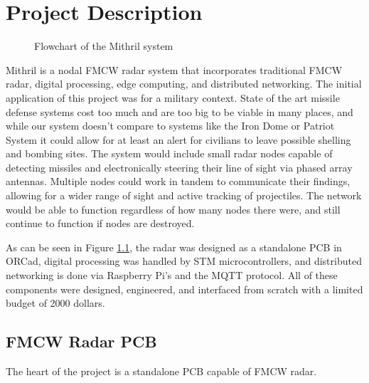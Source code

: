 \chapter{Project Description 
\label{Project Description}}
\begin{figure}[H]
  \centering
  \caption{Flowchart of the Mithril system}
  \label{fig:mithril_flowchart}
  \end{figure}
Mithril is a nodal FMCW radar system that incorporates traditional FMCW radar,
digital processing, edge computing, and distributed networking. The initial application of this project was for a military context.
State of the art missile defense systems cost too much and are too big to be viable in many places, and while our system doesn't compare to
systems like the Iron Dome or Patriot System it could allow for at least an alert for civilians to leave possible shelling and bombing sites.
The system would include small radar nodes capable of detecting missiles and electronically steering their line of sight via phased array antennas.
Multiple nodes could work in tandem to communicate their findings, allowing for a wider range of sight and active tracking of projectiles. The network would
be able to function regardless of how many nodes there were, and still continue to function if nodes are destroyed.

As can be seen in Figure \ref{fig:mithril_flowchart},
the radar was designed as a standalone PCB in ORCad, digital processing was handled by
STM microcontrollers, and distributed networking is done via Raspberry Pi's and the MQTT protocol.
All of these components were designed, engineered, and interfaced from scratch with a limited budget
of 2000 dollars.

\section{FMCW Radar PCB}
The heart of the project is a standalone PCB capable of FMCW radar.
